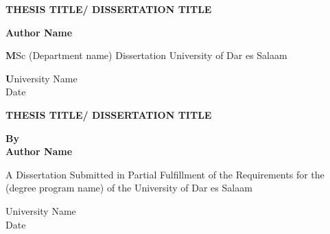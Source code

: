 \documentclass[12pt]{report}    %
\begin{document}
\begin{titlepage}
   \begin{center}
       \vspace*{1cm}


       \textbf {\huge \MakeUppercase{Thesis Title/ Dissertation title}}
        
       \vspace{0.5cm}

       \vspace{6cm}
       \textbf{Author Name}

       \vfill \large
        \textbf    
      MSc (Department name) Dissertation
University of Dar es Salaam
            
       \vspace{0.1cm}
     \textbf
       University Name\\
     \vspace{0.1cm}
       Date
   \end{center}


\end{titlepage}
\begin{titlepage}
   \begin{center}
       \vspace*{1cm}


       \textbf{\huge \MakeUppercase{Thesis Title/ Dissertation title}}

       \vspace{0.5cm}
    
            
       \vspace{0.5cm}
        \vfill
        \textbf{By}\\
         \vspace{0.5cm}
       \textbf{Author Name}

       \vfill \large
       \textbf{}     
 A Dissertation Submitted in Partial Fulfillment of the Requirements for the (degree program name) of the University of Dar es Salaam
            
       \vspace{3cm}
     \textbf{}
       University Name\\
     \vspace{0.1cm}
     \textbf{}
       Date
            
   \end{center}
\end{titlepage}
\end{document}
